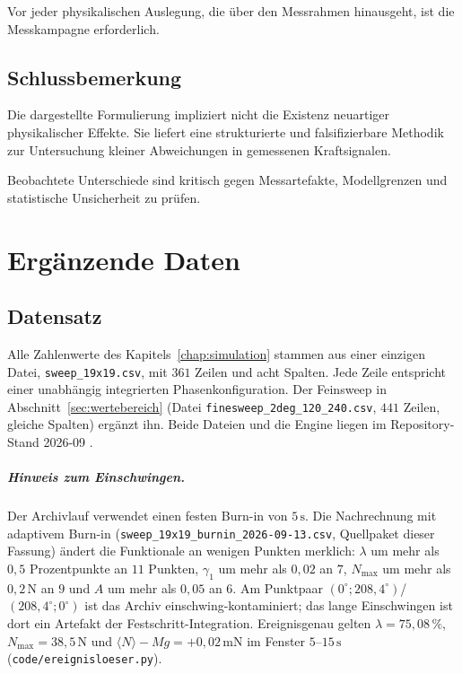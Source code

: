 \documentclass[12pt,a4paper]{report}
\begin{document}
Vor jeder physikalischen Auslegung, die über den Messrahmen hinausgeht,
ist die Messkampagne erforderlich.

\section{Schlussbemerkung}

Die dargestellte Formulierung impliziert nicht die Existenz neuartiger
physikalischer Effekte. Sie liefert eine strukturierte und
falsifizierbare Methodik zur Untersuchung kleiner Abweichungen in
gemessenen Kraftsignalen.

Beobachtete Unterschiede sind kritisch gegen Messartefakte,
Modellgrenzen und statistische Unsicherheit zu prüfen.


\appendix

\chapter{Ergänzende Daten}
\label{app:daten}

\section{Datensatz}
\label{sec:anh-datensatz}

Alle Zahlenwerte des Kapitels~\ref{chap:simulation} stammen aus einer
einzigen Datei, \texttt{sweep\_19x19.csv}, mit $361$ Zeilen und acht
Spalten. Jede Zeile entspricht einer unabhängig integrierten
Phasenkonfiguration. Der Feinsweep in Abschnitt~\ref{sec:wertebereich}
(Datei \texttt{finesweep\_2deg\_120\_240.csv}, $441$ Zeilen, gleiche
Spalten) ergänzt ihn. Beide Dateien und die Engine liegen im
Repository-Stand 2026-09 \cite{frueh2026repo}.

\paragraph{Hinweis zum Einschwingen.}
Der Archivlauf verwendet einen festen Burn-in von $5\,\mathrm{s}$. Die
Nachrechnung mit adaptivem Burn-in
(\texttt{sweep\_19x19\_burnin\_2026-09-13.csv}, Quellpaket dieser Fassung) ändert die Funktionale an wenigen Punkten merklich:
$\lambda$ um mehr als $0{,}5$ Prozentpunkte an $11$ Punkten, $\gamma_1$
um mehr als $0{,}02$ an $7$, $N_{\max}$ um mehr als $0{,}2\,\mathrm{N}$ an
$9$ und $A$ um mehr als $0{,}05$ an $6$. Am Punktpaar
$(0^\circ; 208{,}4^\circ)$/$(208{,}4^\circ; 0^\circ)$ ist das Archiv
einschwing-kontaminiert; das lange Einschwingen ist dort ein Artefakt der
Festschritt-Integration. Ereignisgenau gelten $\lambda = 75{,}08\,\%$,
$N_{\max} = 38{,}5\,\mathrm{N}$ und $\langle N\rangle - Mg =
+0{,}02\,\mathrm{mN}$ im Fenster $5$--$15\,\mathrm{s}$
(\texttt{code/ereignisloeser.py}).
\end{document}
